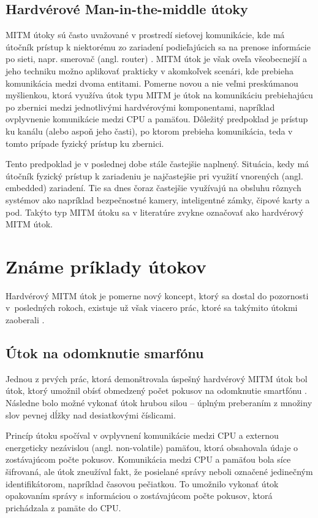 \subsection{Hardvérové Man-in-the-middle útoky}
MITM útoky sú často uvažované v prostredí sieťovej komunikácie, kde má útočník prístup k niektorému zo zariadení podieľajúcich sa na prenose informácie po sieti, napr. smerovač (angl. router) \cite{mitmTheory}. MITM útok je však oveľa všeobecnejší a jeho techniku možno aplikovať prakticky v akomkoľvek scenári, kde prebieha komunikácia medzi dvoma entitami. Pomerne novou a nie veľmi preskúmanou myšlienkou, ktorá využíva útok typu MITM je útok na komunikáciu prebiehajúcu po zbernici medzi jednotlivými hardvérovými komponentami, napríklad ovplyvnenie komunikácie medzi CPU a pamäťou. Dôležitý predpoklad je prístup ku kanálu (alebo aspoň jeho časti), po ktorom prebieha komunikácia, teda v tomto prípade fyzický prístup ku zbernici.

Tento predpoklad je v poslednej dobe stále častejšie naplnený. Situácia, kedy má útočník fyzický prístup k zariadeniu je najčastejšie pri využití vnorených (angl. embedded) zariadení. Tie sa dnes čoraz častejšie využívajú na obsluhu rôznych systémov ako napríklad bezpečnostné kamery, inteligentné zámky, čipové karty a pod. Takýto typ MITM útoku sa v literatúre zvykne označovať ako hardvérový MITM útok.

\section{Známe príklady útokov} \label{kap1:sek:priklady}
Hardvérový MITM útok je pomerne nový koncept, ktorý sa dostal do pozornosti v~posledných rokoch, existuje už však viacero prác, ktoré sa takýmito útokmi zaoberali \cite{mitmPCIe, mitmTouch, mitmCAN, mitmI2C, mitmSPI}.

\subsection{Útok na odomknutie smarfónu}
Jednou z prvých prác, ktorá demonštrovala úspešný hardvérový MITM útok bol útok, ktorý umožnil obísť obmedzený počet pokusov na odomknutie
smartfónu \cite{mitmPCIe}. Následne bolo možné vykonať útok hrubou silou -- úplným preberaním z množiny slov  pevnej dĺžky nad desiatkovými číslicami.

Princíp útoku spočíval v ovplyvnení komunikácie medzi CPU a externou energeticky nezávislou (angl. non-volatile) pamäťou, ktorá obsahovala údaje o zostávajúcom počte pokusov. Komunikácia medzi CPU a pamäťou bola síce šifrovaná, ale útok zneužíval fakt, že posielané správy neboli označené jedinečným identifikátorom, napríklad časovou pečiatkou. To umožnilo vykonať útok opakovaním správy s informáciou o zostávajúcom počte pokusov, ktorá prichádzala z pamäte do CPU.

